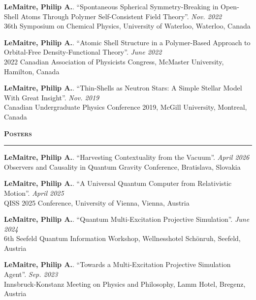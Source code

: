 \textbf{LeMaitre, Philip A.}. “Spontaneous Spherical Symmetry-Breaking in Open-Shell Atoms Through Polymer Self-Consistent Field Theory”. \hfill\textit{{Nov. 2022}}\\
36th Symposium on Chemical Physics, University of Waterloo, Waterloo, Canada

\textbf{LeMaitre, Philip A.}. “Atomic Shell Structure in a Polymer-Based Approach to Orbital-Free Density-Functional Theory”. \hfill\textit{{June 2022}}\\
2022 Canadian Association of Physicists Congress, McMaster University, Hamilton, Canada

\textbf{LeMaitre, Philip A.}. “Thin-Shells as Neutron Stars: A Simple Stellar Model With Great Insight”. \hfill\textit{{Nov. 2019}}\\
Canadian Undergraduate Physics Conference 2019, McGill University, Montreal, Canada

\vspace{0.65em}
\noindent\textsc{\textbf{Posters}}\par
\sectionlineskip\noindent\rule{\linewidth}{0.4pt}\par\vspace{0.45em}
\textbf{LeMaitre, Philip A.}. “Harvesting Contextuality from the Vacuum”. \hfill\textit{{April 2026}}\\
Observers and Causality in Quantum Gravity Conference, Bratislava, Slovakia

\textbf{LeMaitre, Philip A.}. “A Universal Quantum Computer from Relativistic Motion”. \hfill\textit{{April 2025}}\\
QISS 2025 Conference, University of Vienna, Vienna, Austria

\textbf{LeMaitre, Philip A.}. “Quantum Multi-Excitation Projective Simulation”. \hfill\textit{{June 2024}}\\
6th Seefeld Quantum Information Workshop, Wellnesshotel Schönruh, Seefeld, Austria

\textbf{LeMaitre, Philip A.}. “Towards a Multi-Excitation Projective Simulation Agent”. \hfill\textit{{Sep. 2023}}\\
Innsbruck-Konstanz Meeting on Physics and Philosophy, Lamm Hotel, Bregenz, Austria
